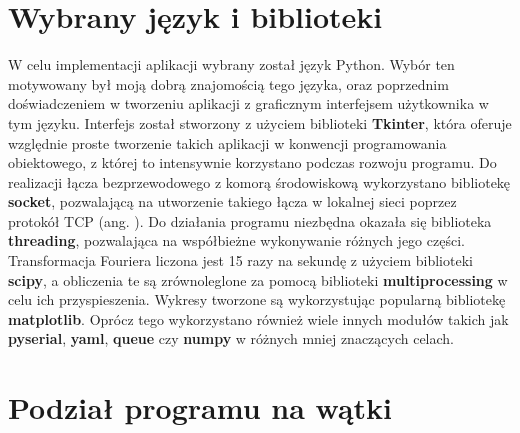 \section{Wybrany język i biblioteki} \label{aplikacja_implementacja}

W celu implementacji aplikacji wybrany został język Python. Wybór ten motywowany był moją dobrą znajomością tego języka, oraz poprzednim doświadczeniem w tworzeniu aplikacji z graficznym interfejsem użytkownika w tym języku. Interfejs został stworzony z użyciem biblioteki \textbf{Tkinter}, która oferuje względnie proste tworzenie takich aplikacji w konwencji programowania obiektowego, z której to intensywnie korzystano podczas rozwoju programu. Do realizacji łącza bezprzewodowego z komorą środowiskową wykorzystano bibliotekę \textbf{socket}, pozwalającą na utworzenie takiego łącza w lokalnej sieci poprzez protokół TCP (ang. ). Do działania programu niezbędna okazała się biblioteka \textbf{threading}, pozwalająca na współbieżne wykonywanie różnych jego części. Transformacja Fouriera liczona jest 15 razy na sekundę z użyciem biblioteki \textbf{scipy}, a obliczenia te są zrównoleglone za pomocą biblioteki \textbf{multiprocessing} w celu ich przyspieszenia. Wykresy tworzone są wykorzystując popularną bibliotekę \textbf{matplotlib}. Oprócz tego wykorzystano również wiele innych modułów takich jak \textbf{pyserial}, \textbf{yaml}, \textbf{queue} czy \textbf{numpy} w różnych mniej znaczących celach.

\section{Podział programu na wątki}

